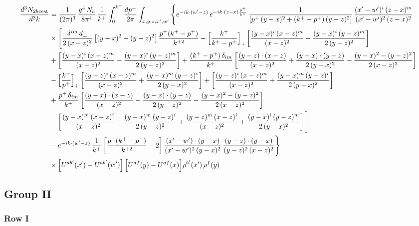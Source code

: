 \documentclass[9pt]{article}
\numberwithin{equation}{section}
\begin{document}
\begin{align}
\frac{d^{3}N_{2b\,\rm rest}}{d^{3}k} & =\frac{1}{(2\pi)^{3}}\,\frac{g^{4}\,N_{c}}{8\pi^{4}}\,\frac{1}{k^{+}}\int_{0}^{k^{+}}\frac{dp^{+}}{2\pi}\int_{x,y,z,x',w'}\Bigg\{e^{-ik\cdot(w'-z)}\,e^{-ik\cdot(z-x)\frac{p^{+}}{k^{+}}}\,\frac{1}{\left[p^{+}\,(y-x)^{2}+(k^{+}-p^{+})\,(y-z)^{2}\right]}\,\frac{(x'-w')^{i}\,(z-x)^{m}}{(x'-w')^{2}\,(z-x)^{2}}\notag\\
&\times\Bigg[\frac{\delta^{im}\,d_{\perp}}{2\,(x-z)^{2}}\left[(y-x)^{2}-(y-z)^{2}\right]\frac{p^{+}(k^{+}-p^{+})}{k^{+2}}
-\Big[\frac{k^{+}}{k^{+}-p^{+}}\Big]_{+}\left[\frac{(y-x)^{i}\,(x-z)^{m}}{(x-z)^{2}}-\frac{(y-x)^{i}\,(y-z)^{m}}{2\,(y-z)^{2}}\right]\notag\\
&+\left[\frac{(y-x)^{i}\,(x-z)^{m}}{(x-z)^{2}}-\frac{(y-x)^{i}\,(y-z)^{m}}{2\,(y-z)^{2}}\right]
+\frac{(k^{+}-p^{+})\,\delta_{im}}{k^{+}}\left[\frac{(y-z)\cdot(x-z)}{(x-z)^{2}}+\frac{(y-x)\cdot(y-z)}{2\,(y-x)^{2}}-\frac{(y-x)^{2}-(y-z)^{2}}{2\,(x-z)^{2}}\right]\notag\\
&-\Big[\frac{k^{+}}{p^{+}}\Big]_{+}\left[\frac{(y-z)^{i}\,(x-z)^{m}}{(x-z)^{2}}+\frac{(y-x)^{m}\,(y-z)^{i}}{2\,(y-x)^{2}}\right]+\left[\frac{(y-z)^{i}\,(x-z)^{m}}{(x-z)^{2}}+\frac{(y-x)^{m}\,(y-z)^{i}}{2\,(y-x)^{2}}\right]\notag\\
&+\frac{p^{+}\,\delta_{im}}{k^{+}}\left[\frac{(y-x)\cdot(x-z)}{(x-z)^{2}}-\frac{(y-x)\cdot(y-z)}{2\,(y-z)^{2}}-\frac{(y-x)^{2}-(y-z)^{2}}{2\,(x-z)^{2}}\right]\notag\\
&-\left[\frac{(y-x)^{m}\,(x-z)^{i}}{(x-z)^{2}}-\frac{(y-x)^{m}\,(y-z)^{i}}{2\,(y-z)^{2}}+\frac{(y-z)^{m}\,(x-z)^{i}}{(x-z)^{2}}+\frac{(y-x)^{i}\,(y-z)^{m}}{2\,(y-x)^{2}}\right]\Bigg]\notag\\
&-e^{-ik\cdot(w'-x)}\,\frac{1}{k^{+}}\left[\frac{p^{+}(k^{+}-p^{+})}{k^{+2}}-2\right]\frac{(x'-w')\cdot(y-x)}{(x'-w')^{2}\,(y-x)^{2}}\,\frac{(y-z)\cdot(y-x)}{(y-z)^{2}\,(x-z)^{2}}\Bigg\}\notag\\
&\times\Big[U^{ab'}(x')-U^{ab'}(w')\Big]\,\Big[U^{af}(y)-U^{af}(x)\Big]\rho^{b'}(x')\,\rho^{f}(y)
\end{align}

\subsection{Group II}
\subsubsection{Row I}
\end{document}
